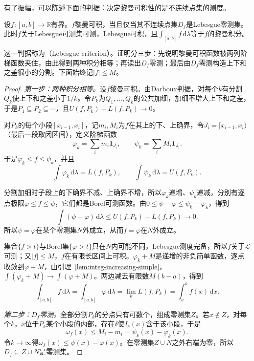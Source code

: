 有了振幅，可以陈述下面的判据：决定黎曼可积性的是不连续点集的测度。

\begin{theorem}[黎曼可积的Lebesgue判据]
\label{thm:integ-riemann-lebesgue}
设$f:[a,b]\to\mathbb R$有界。$f$黎曼可积，当且仅当其不连续点集$D_f$是Lebesgue零测集。此时$f$关于Lebesgue可测集可测，Lebesgue可积，且$\int_{[a,b]}f\,\mathrm d\lambda$等于$f$的黎曼积分。
\end{theorem}

这一判据称为（Lebesgue criterion）。证明分三步：先说明黎曼可积函数被两列阶梯函数夹住，由此得到两种积分相等；再读出$D_f$零测；最后由$D_f$零测构造上下和之差很小的分割。下面始终记$\lvert f\rvert\leq M$。

\begin{proof}
\emph{第一步：两种积分相等。}设$f$黎曼可积。由Darboux判据，对每个$k$有分割$Q_k$使上下和之差小于$1/k$。令$P_k$为$Q_1,\dots,Q_k$的公共加细，加细不增大上下和之差，于是$P_1\subseteq P_2\subseteq\cdots$，且$U(f,P_k)-L(f,P_k)\to0$。

对$P_k$的每个小段$[x_{i-1},x_i]$，记$m_i,M_i$为$f$在其上的下、上确界，令$J_i=[x_{i-1},x_i)$（最后一段取闭区间），定义阶梯函数
\[
 \varphi_k=\sum_im_i\mathbf 1_{J_i},\qquad\psi_k=\sum_iM_i\mathbf 1_{J_i}.
\]
于是$\varphi_k\leq f\leq\psi_k$，并且
\[
 \int\varphi_k\,\mathrm d\lambda=L(f,P_k),\qquad\int\psi_k\,\mathrm d\lambda=U(f,P_k).
\]

分割加细时子段上的下确界不减、上确界不增，所以$\varphi_k$递增、$\psi_k$递减，分别有逐点极限$\varphi\leq f\leq\psi$，它们都是Borel可测函数。由$0\leq\psi-\varphi\leq\psi_k-\varphi_k$，得到
\[
 \int(\psi-\varphi)\,\mathrm d\lambda\leq U(f,P_k)-L(f,P_k)\to0 .
\]
所以$\psi=\varphi$在某个零测集$N$外成立，从而$f=\varphi$在$N$外成立。

集合$\{f>t\}$与Borel集$\{\varphi>t\}$只在$N$内可能不同，Lebesgue测度完备，所以$f$关于$\mathcal L$可测；又$\lvert f\rvert\leq M$，$f$在有限长区间上可积。$\varphi_k+M$是递增的非负简单函数，逐点收敛到$\varphi+M$，由引理~\ref{lem:integ-increasing-simple}，$\int(\varphi_k+M)\to\int(\varphi+M)$。两边减去有限数$M(b-a)$，得到
\[
 \int_{[a,b]}f\,\mathrm d\lambda=\int_{[a,b]}\varphi\,\mathrm d\lambda=\lim_kL(f,P_k)=\int_a^bf(x)\,\mathrm dx .
\]

\emph{第二步：$D_f$零测。}全部分割$P_k$的分点只有可数个，组成零测集$Z$。若$x\notin Z$，对每个$k$，$x$位于$P_k$某个小段的内部，存在$\delta$使$I_\delta(x)$含于该小段，于是
\[
 \omega_f(x)\leq M_i-m_i=\psi_k(x)-\varphi_k(x).
\]
令$k\to\infty$得$\omega_f(x)\leq\psi(x)-\varphi(x)$。在零测集$Z\cup N$之外右端为零，所以$D_f\subseteq Z\cup N$是零测集。


\end{proof}
